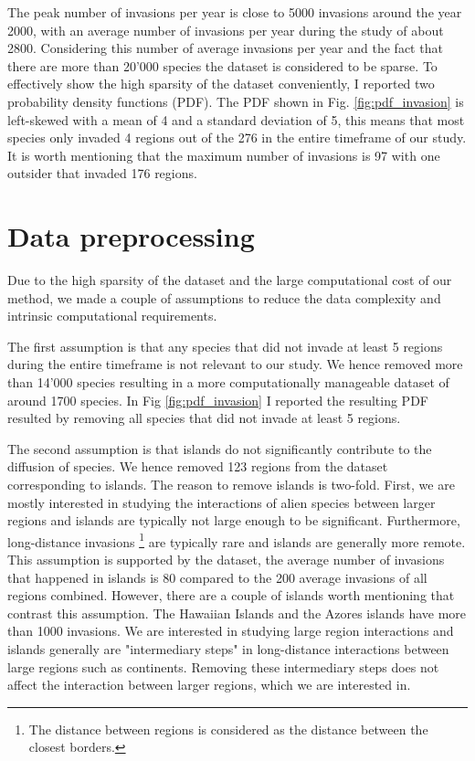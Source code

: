 \documentclass[mscthesis]{usiinfthesis}
\begin{document}
The peak number of invasions per year is close to 5000 invasions around the year 2000, with an average number of invasions per year during the study of about 2800. Considering this number of average invasions per year and the fact that there are more than 20'000 species the dataset is considered to be sparse. To effectively show the high sparsity of the dataset conveniently, I reported two probability density functions (PDF). The PDF shown in Fig. \ref{fig:pdf_invasion} is left-skewed with a mean of 4 and a standard deviation of 5, this means that most species only invaded 4 regions out of the 276 in the entire timeframe of our study. It is worth mentioning that the maximum number of invasions is 97 with one outsider that invaded 176 regions. 

\section{Data preprocessing}
Due to the high sparsity of the dataset and the large computational cost of our method, we made a couple of assumptions to reduce the data complexity and intrinsic computational requirements. 

The first assumption is that any species that did not invade at least 5 regions during the entire timeframe is not relevant to our study. We hence removed more than 14'000 species resulting in a more computationally manageable dataset of around 1700 species. In Fig \ref{fig:pdf_invasion} I reported the resulting PDF resulted by removing all species that did not invade at least 5 regions. 

The second assumption is that islands do not significantly contribute to the diffusion of species. We hence removed 123 regions from the dataset corresponding to islands. The reason to remove islands is two-fold. First, we are mostly interested in studying the interactions of alien species between larger regions and islands are typically not large enough to be significant. Furthermore, long-distance invasions \footnote{The distance between regions is considered as the distance between the closest borders.} are typically rare \cite{paper:lady} and islands are generally more remote. This assumption is supported by the dataset, the average number of invasions that happened in islands is 80 compared to the 200 average invasions of all regions combined. However, there are a couple of islands worth mentioning that contrast this assumption. The Hawaiian Islands and the Azores islands have more than 1000 invasions. We are interested in studying large region interactions and islands generally are "intermediary steps" in long-distance interactions between large regions such as continents. Removing these intermediary steps does not affect the interaction between larger regions, which we are interested in.
\end{document}
